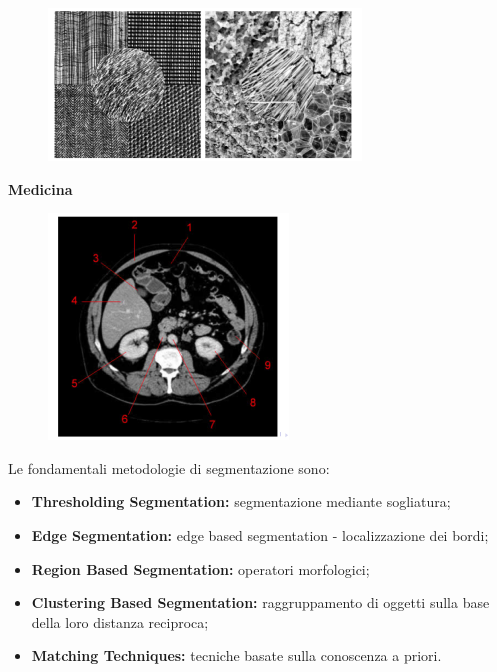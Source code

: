 \begin{figure}[H]
    \centering
    \includegraphics[width=\linewidth, keepaspectratio]{capitoli/immagini/imgs/texture.png}
\end{figure}
\textbf{Medicina}
\begin{figure}[H]
    \centering
    \includegraphics[width=\linewidth, keepaspectratio]{capitoli/immagini/imgs/medicina.png}
\end{figure}
Le fondamentali metodologie di segmentazione sono:
\begin{itemize}
    \item \textbf{Thresholding Segmentation:} segmentazione mediante
          sogliatura;
    \item \textbf{Edge Segmentation:} edge based segmentation - localizzazione
          dei bordi;
    \item \textbf{Region Based Segmentation:} operatori morfologici;
    \item \textbf{Clustering Based Segmentation:} raggruppamento di oggetti
          sulla base della loro distanza reciproca;
    \item \textbf{Matching Techniques:} tecniche basate sulla conoscenza a
          priori.
\end{itemize}

